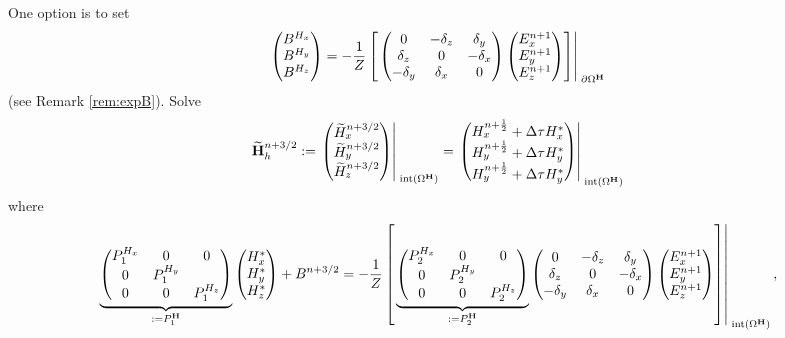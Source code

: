 \documentclass[12pt,reqno]{amsart}
\newcommand{\h}{{\bf H}}
\theoremstyle{definition}
\numberwithin{equation}{section}
\newcommand{\intr}[1]{\mathrm{int}(#1)}
\def\Gw{\Omega}     \def\Gx{\Xi}         \def\Gy{\Psi}
\begin{document}
	One option is to set 
	\begin{equation}\label{eq:BH}
	\begin{pmatrix}
		B^{H_x}\\ B^{H_y}\\ B^{H_z}
	\end{pmatrix}
	=
	-\frac{1}{Z}
	\left[ \left.	
	\begin{pmatrix}
		0& -\delta_z & \delta _y\\
		\delta_z&0&-\delta_x\\
		-\delta_y&\delta_x&0\\
	\end{pmatrix}
	\begin{pmatrix}
		E_x^{n+1}\\
		E_y^{n+1}\\
		E_z^{n+1}
	\end{pmatrix}\right]\right|_{\; \partial{\Gw^{\h}}}^{\;}
	\end{equation}
	(see Remark \ref{rem:expB}).
Solve
	$$
	\widetilde{\h}_h^{n+3/2}:=
	\left.
	\begin{pmatrix}
		\widetilde{H}_x^{n+3/2}\\
		\widetilde{H}_y^{n+3/2}\\
		\widetilde{H}_z^{n+3/2}
	\end{pmatrix}\right|_{\; \intr{\Gw^{\h}}}^{\;}=
\left.
	\begin{pmatrix}
		H_x^{n+\frac{1}{2}}+\Delta \tau H_x^{*}\\
		H_y^{n+\frac{1}{2}}+\Delta \tau H_y^{*}\\
		H_y^{n+\frac{1}{2}}+\Delta \tau H_y^{*}
	\end{pmatrix}\right|_{\; \intr{\Gw^{\h}}}^{\;}
	$$
	where 
	$$
	\underbrace{
	\begin{pmatrix}
		P_1^{H_x}  & 0&0 \\
		0 & 	P_1^{H_y}  &\\
		0&0&	P_1^{H_z} 
	\end{pmatrix}
}_{:=P_1^\h}
	\begin{pmatrix}
		H_x^{*}\\
		H_y^{*} \\
		H_z^{*}
	\end{pmatrix}+B^{n+3/2}=-\frac{1}{Z}
\left[ \left.
	\underbrace{
	\begin{pmatrix}
		P_2^{H_x} & 0&0 \\
		0 & P_2^{H_y} &\\
		0&0&P_2^{H_z} 
	\end{pmatrix}
}_{:=P_2^\h}
	\begin{pmatrix}
		0& -\delta_z & \delta _y\\
		\delta_z&0&-\delta_x\\
		-\delta_y&\delta_x&0\\
	\end{pmatrix}
	\begin{pmatrix}
		E_x^{n+1}\\
		E_y^{n+1}\\
		E_z^{n+1}
	\end{pmatrix}\right]\right|_{\; \intr{\Gw^{\h}}}^{\;},
	$$
\end{document}
